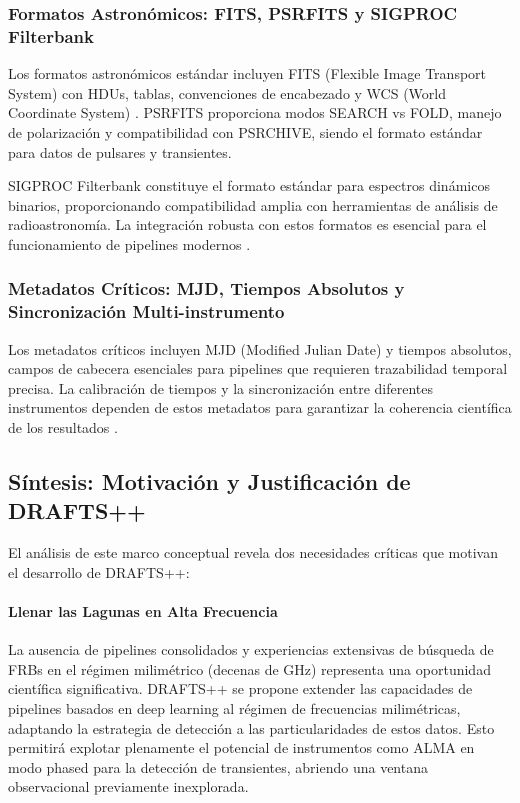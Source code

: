 \subsubsection{Formatos Astronómicos: FITS, PSRFITS y SIGPROC Filterbank}

Los formatos astronómicos estándar incluyen FITS (Flexible Image Transport System) con HDUs, tablas, convenciones de encabezado y WCS (World Coordinate System) \citep{Hotan_2004_PSRFITS}. PSRFITS proporciona modos SEARCH vs FOLD, manejo de polarización y compatibilidad con PSRCHIVE, siendo el formato estándar para datos de pulsares y transientes.

SIGPROC Filterbank constituye el formato estándar para espectros dinámicos binarios, proporcionando compatibilidad amplia con herramientas de análisis de radioastronomía. La integración robusta con estos formatos es esencial para el funcionamiento de pipelines modernos \citep{Hotan_2004_PSRFITS}.

\subsubsection{Metadatos Críticos: MJD, Tiempos Absolutos y Sincronización Multi-instrumento}

Los metadatos críticos incluyen MJD (Modified Julian Date) y tiempos absolutos, campos de cabecera esenciales para pipelines que requieren trazabilidad temporal precisa. La calibración de tiempos y la sincronización entre diferentes instrumentos dependen de estos metadatos para garantizar la coherencia científica de los resultados \citep{Hotan_2004_PSRFITS}.

\subsection{Síntesis: Motivación y Justificación de DRAFTS++}

El análisis de este marco conceptual revela dos necesidades críticas que motivan el desarrollo de DRAFTS++:

\paragraph{Llenar las Lagunas en Alta Frecuencia}

La ausencia de pipelines consolidados y experiencias extensivas de búsqueda de FRBs en el régimen milimétrico (decenas de GHz) representa una oportunidad científica significativa. DRAFTS++ se propone extender las capacidades de pipelines basados en deep learning al régimen de frecuencias milimétricas, adaptando la estrategia de detección a las particularidades de estos datos. Esto permitirá explotar plenamente el potencial de instrumentos como ALMA en modo phased para la detección de transientes, abriendo una ventana observacional previamente inexplorada.

